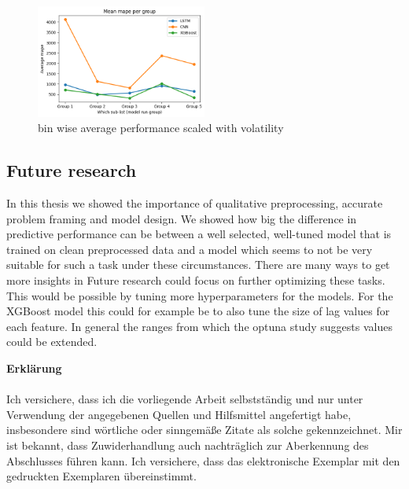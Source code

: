 \documentclass[a4paper,12pt]{report}
\begin{document}
\begin{figure}[htbp]
  \centering
  \includegraphics[width=0.5\textwidth]{images/averages_rescaled.png}
  \caption{bin wise average performance scaled with volatility}
  \label{fig:fullwidth}
\end{figure}



\subsection*{Future research}

In this thesis we showed the importance of qualitative preprocessing, accurate problem framing and model design. We showed how big the difference in predictive performance can be between a well selected, well-tuned model that is trained on clean preprocessed data and a model which seems to not be very suitable for such a task under these circumstances. There are many ways to get more insights in Future research could focus on further optimizing these tasks. This would be possible by tuning more hyperparameters for the models. For the XGBoost model this could for example be to also tune the size of lag values for each feature. In general the ranges from which the optuna study suggests values could be extended. 


\printbibliography





\newpage



\vspace*{\fill}         %

{\fontsize{20}{23}\selectfont\textbf{Erklärung}}\\\\

Ich versichere, dass ich die vorliegende Arbeit selbstständig und nur unter Verwendung der
angegebenen Quellen und Hilfsmittel angefertigt habe, insbesondere sind wörtliche oder
sinngemäße Zitate als solche gekennzeichnet. Mir ist bekannt, dass Zuwiderhandlung auch
nachträglich zur Aberkennung des Abschlusses führen kann.
Ich versichere, dass das elektronische Exemplar mit den gedruckten Exemplaren übereinstimmt.\\\\
\end{document}
